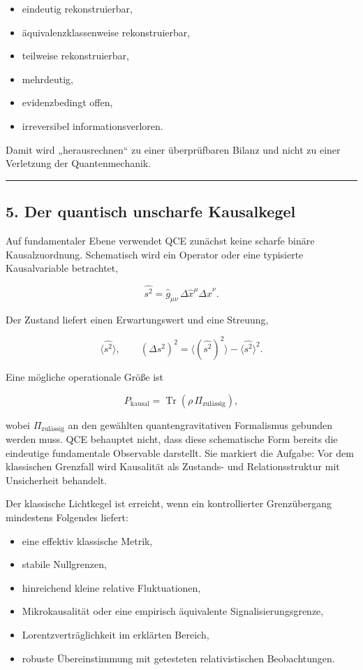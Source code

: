 \documentclass[
  11pt,
  a4paper,
]{article}
\providecommand{\tightlist}{%
  \setlength{\itemsep}{0pt}\setlength{\parskip}{0pt}}
\begin{document}
\begin{itemize}
\tightlist
\item
  eindeutig rekonstruierbar,
\item
  äquivalenzklassenweise rekonstruierbar,
\item
  teilweise rekonstruierbar,
\item
  mehrdeutig,
\item
  evidenzbedingt offen,
\item
  irreversibel informationsverloren.
\end{itemize}

Damit wird „herausrechnen`` zu einer überprüfbaren Bilanz und nicht zu
einer Verletzung der Quantenmechanik.

\begin{center}\rule{0.5\linewidth}{0.5pt}\end{center}

\subsection{5. Der quantisch unscharfe
Kausalkegel}\label{der-quantisch-unscharfe-kausalkegel}

Auf fundamentaler Ebene verwendet QCE zunächst keine scharfe binäre
Kausalzuordnung. Schematisch wird ein Operator oder eine typisierte
Kausalvariable betrachtet,

\[
\widehat{s^2}
=
\widehat g_{\mu\nu}
\,\Delta\widehat x^\mu
\Delta\widehat x^\nu.
\]

Der Zustand liefert einen Erwartungswert und eine Streuung,

\[
\langle \widehat{s^2}\rangle,
\qquad
(\Delta s^2)^2
=
\langle (\widehat{s^2})^2\rangle
-
\langle \widehat{s^2}\rangle^2.
\]

Eine mögliche operationale Größe ist

\[
P_{\text{kausal}}
=
\operatorname{Tr}(\rho\,\Pi_{\text{zulässig}}),
\]

wobei \(\Pi_{\text{zulässig}}\) an den gewählten quantengravitativen
Formalismus gebunden werden muss. QCE behauptet nicht, dass diese
schematische Form bereits die eindeutige fundamentale Observable
darstellt. Sie markiert die Aufgabe: Vor dem klassischen Grenzfall wird
Kausalität als Zustands- und Relationsstruktur mit Unsicherheit
behandelt.

Der klassische Lichtkegel ist erreicht, wenn ein kontrollierter
Grenzübergang mindestens Folgendes liefert:

\begin{itemize}
\tightlist
\item
  eine effektiv klassische Metrik,
\item
  stabile Nullgrenzen,
\item
  hinreichend kleine relative Fluktuationen,
\item
  Mikrokausalität oder eine empirisch äquivalente Signalisierungsgrenze,
\item
  Lorentzverträglichkeit im erklärten Bereich,
\item
  robuste Übereinstimmung mit getesteten relativistischen Beobachtungen.
\end{itemize}
\end{document}
